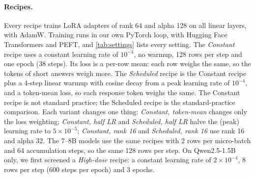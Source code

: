 \documentclass{article}
\begin{document}
\paragraph{Recipes.} Every recipe trains LoRA adapters \citep{hu2022lora} of
rank 64 and alpha 128 on all linear layers, with AdamW. Training runs in our
own PyTorch loop, with Hugging Face Transformers and PEFT, and
\cref{tab:settings} lists every setting. The \emph{Constant}
recipe uses a constant learning rate of $10^{-4}$, no warmup, 128 rows per step
and one epoch (38 steps). Its loss is a per-row mean: each row weighs the same,
so the tokens of short answers weigh more. The \emph{Scheduled} recipe is the
Constant recipe plus a 4-step linear warmup with cosine decay from a peak
learning rate of $10^{-4}$, and a token-mean loss, so each response token
weighs the same. The Constant recipe is not standard practice; the Scheduled
recipe is the standard-practice comparison. Each variant changes one thing:
\emph{Constant, token-mean} changes only the loss weighting; \emph{Constant,
half LR} and \emph{Scheduled, half LR} halve the (peak) learning rate to
$5 \times 10^{-5}$; \emph{Constant, rank 16} and \emph{Scheduled, rank 16} use
rank 16 and alpha 32. The 7--8B models use the same recipes with 2 rows per
micro-batch and 64 accumulation steps, so the same 128 rows per step. On
Qwen2.5-1.5B only, we first screened a \emph{High-dose} recipe: a constant
learning rate of $2 \times 10^{-4}$, 8 rows per step (600 steps per epoch) and
3 epochs.

\end{document}
